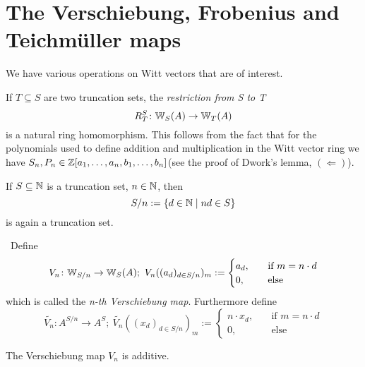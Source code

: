 \section{The Verschiebung, Frobenius and Teichmüller maps}
We have various operations on Witt vectors that are of interest.
\begin{definition}
    If $T \subseteq S$ are two truncation sets, the \textit{restriction from S to T}
    \[
      R_T^S \colon \mathbb{W}_S(A) \to \mathbb{W}_T(A)  
    \]
    is a natural ring homomorphism. 
    This follows from the fact that
    for the polynomials used to define addition and multiplication in the Witt vector ring
    we have $S_n,P_n \in \mathbb{Z}[a_1,\dots,a_n,b_1,\dots,b_n]$(see the proof of Dwork's lemma, $(\Leftarrow)$).
    
\end{definition}
If $S\subseteq \mathbb{N}$ is a truncation set, $n \in \mathbb{N}$, then
\[
   S/n := \{d \in \mathbb{N} \mid nd \in S\}
\]
is again a truncation set.
\begin{definition}[Verschiebung] \
    Define 
    \[
        V_n \colon \mathbb{W}_{S/n} \to \mathbb{W}_S(A);\  
        V_n((a_d)_{d \in S/n})_m := 
        \begin{cases}
            a_d, &\quad \text{if $m=n \cdot d$} \\
            0,  &\quad \text{else}
        \end{cases}
    \]
    which is called the \textit{n-th Verschiebung map}. Furthermore define
    \[
        \widetilde{V_n} \colon A^{S/n} \to A^S;\ 
        \widetilde{V_n}((x_d)_{d \in S/n})_m := 
        \begin{cases}
            n \cdot x_d, &\quad \text{if $m=n \cdot d$} \\
            0,  &\quad \text{else}
        \end{cases}
    \]
\end{definition}
\begin{lemma} \label{lem: verschiebung is additive}
    The Verschiebung map $V_n$ is additive.
\end{lemma}
